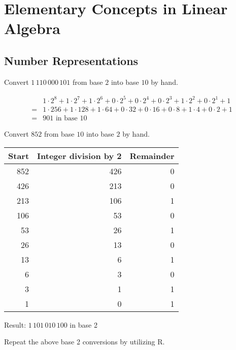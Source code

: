 \documentclass
[answers]
{exercise_sheet}
\begin{document}
\section*{Elementary Concepts in Linear Algebra}

\subsection*{Number Representations}

\begin{Question}{1}
Convert $1\,110\,000\,101$ from base $2$ into base $10$ by hand. 
\end{Question}

\makeatletter\if@answers\begin{Answer}{3}
\begin{align*}
& 1 \cdot 2^8 + 1 \cdot 2^7 + 1 \cdot 2^6 + 0 \cdot 2^5 + 0 \cdot 2^4 + 0 \cdot 2^3 + 1 \cdot 2^2 + 0 \cdot 2^1 + 1 \\
= & 1 \cdot 256 + 1 \cdot 128 + 1 \cdot 64 + 0 \cdot 32 + 0 \cdot 16 + 0 \cdot 8 + 1 \cdot 4 + 0 \cdot 2 + 1 \\
= & 901 \text{ in base 10}
\end{align*}
\end{Answer}\fi\makeatother

\begin{Question}{1}
Convert $852$ from base $10$ into base $2$ by hand. 
\end{Question}

\makeatletter\if@answers\begin{Answer}{8}
\begin{tabular}{rrr}
\textbf{Start} & \textbf{Integer division by 2} & \textbf{Remainder} \\ \midrule
852 & 426 & 0 \\
426 & 213 & 0 \\
213 & 106 & 1 \\
106 & 53 & 0 \\
53 & 26 & 1 \\
26 & 13 & 0 \\
13 & 6 & 1\\
6 & 3 & 0\\
3 & 1 & 1 \\
1 & 0 & 1 
\end{tabular}

Result: $1\,101\,010\,100$ in base 2
\end{Answer}\fi\makeatother

\begin{Question}{3}
Repeat the above base 2 conversions by utilizing R.  
\end{Question}
\end{document}
